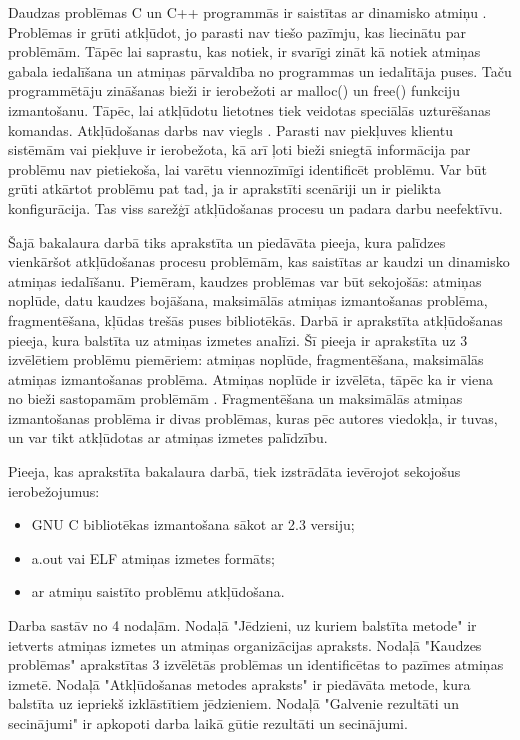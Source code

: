 ﻿Daudzas problēmas C un C++ programmās ir saistītas ar dinamisko atmiņu \cite{TFM}.
Problēmas ir grūti atkļūdot, jo parasti nav tiešo pazīmju, kas liecinātu par problēmām.
Tāpēc lai saprastu, kas notiek, ir svarīgi zināt kā notiek atmiņas gabala iedalīšana un atmiņas pārvaldība no programmas un iedalītāja puses.
Taču programmētāju zināšanas bieži ir ierobežoti ar malloc() un free() funkciju izmantošanu. 
Tāpēc, lai atkļūdotu lietotnes tiek veidotas speciālās uzturēšanas komandas.
Atkļūdošanas darbs nav viegls \cite{ER}. Parasti nav piekļuves klientu sistēmām vai piekļuve ir ierobežota, kā arī ļoti bieži sniegtā informācija par problēmu nav pietiekoša, lai varētu viennozīmīgi identificēt problēmu.
Var būt grūti atkārtot problēmu pat tad, ja ir aprakstīti scenāriji un ir pielikta konfigurācija.
Tas viss sarežģī atkļūdošanas procesu un padara darbu neefektīvu.

Šajā bakalaura darbā tiks aprakstīta un piedāvāta pieeja, kura palīdzes vienkāršot atkļūdošanas procesu problēmām, kas saistītas ar kaudzi un dinamisko atmiņas iedalīšanu.
Piemēram, kaudzes problēmas var būt sekojošās: atmiņas noplūde, datu kaudzes bojāšana, maksimālās atmiņas izmantošanas problēma, fragmentēšana, kļūdas trešās puses bibliotēkās.
Darbā ir aprakstīta atkļūdošanas pieeja, kura balstīta uz atmiņas izmetes analīzi.
Šī pieeja ir aprakstīta uz 3 izvēlētiem problēmu piemēriem: atmiņas noplūde, fragmentēšana, maksimālās atmiņas izmantošanas problēma.
Atmiņas noplūde ir izvēlēta, tāpēc ka ir viena no bieži sastopamām problēmām \cite{GNED}.
Fragmentēšana un maksimālās atmiņas izmantošanas problēma ir divas problēmas, kuras pēc autores viedokļa, ir tuvas, un var tikt atkļūdotas ar atmiņas izmetes palīdzību.

Pieeja, kas aprakstīta bakalaura darbā, tiek izstrādāta ievērojot sekojošus ierobežojumus:
\begin{itemize}
	\item GNU C bibliotēkas izmantošana sākot ar 2.3 versiju;
    \item a.out vai ELF atmiņas izmetes formāts;
    \item ar atmiņu saistīto problēmu atkļūdošana.
\end{itemize} 

Darba sastāv no 4 nodaļām. Nodaļā "Jēdzieni, uz kuriem balstīta metode" ir ietverts atmiņas izmetes un atmiņas organizācijas apraksts.
Nodaļā "Kaudzes problēmas" aprakstītas 3 izvēlētās problēmas un identificētas to pazīmes atmiņas izmetē. 
Nodaļā "Atkļūdošanas metodes apraksts" ir piedāvāta metode, kura balstīta uz iepriekš izklāstītiem jēdzieniem.
Nodaļā "Galvenie rezultāti un secinājumi" ir apkopoti darba laikā gūtie rezultāti un secinājumi.

